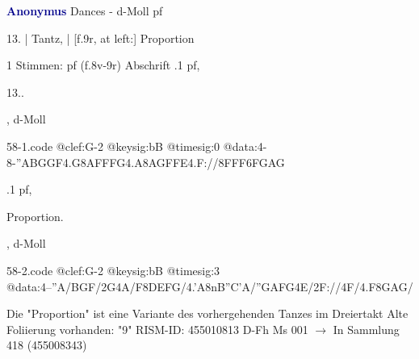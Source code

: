 \documentclass[twocolumn]{book}
\begin{document}
\newline \par \vspace{7pt} \textcolor{darkblue}{\textbf{Anonymus  }}
\newline Dances - d-Moll
\newline pf
\newline \begin{itshape}[f.8v, at left:] 13. | Tantz, | [f.9r, at left:] Proportion\end{itshape} 
\newline \textcolor{darkblue}{}  1 Stimmen: pf  (f.8v-9r)
\newline Abschrift
.1  pf, \begin{itshape}13..\end{itshape}, d-Moll  
\begin{filecontents*}{58-1.code}
@clef:G-2
@keysig:bB
@timesig:0
@data:4-8-''A{BGGF}4.G8A{FFFG}4.A8A{GFFE}4.F://8F{FF}{6FGAG}
\end{filecontents*}
\newline
%
.1  pf, \begin{itshape}Proportion.\end{itshape}, d-Moll  
\begin{filecontents*}{58-2.code}
@clef:G-2
@keysig:bB
@timesig:3
@data:4--''A/BGF/2G4A/F{8DEFG}/4.'A{8nB''C'A}/{''GAFG}4E/2F://4F/4.F{8GAG}/
\end{filecontents*}
\newline
%
\newline Die "Proportion" ist eine Variante des vorhergehenden Tanzes im Dreiertakt
\newline Alte Foliierung vorhanden: "9"
\newline RISM-ID: 455010813
\newline D-Fh  Ms 001
\newline $\rightarrow$ In Sammlung 418 (455008343)
      
\end{document}
